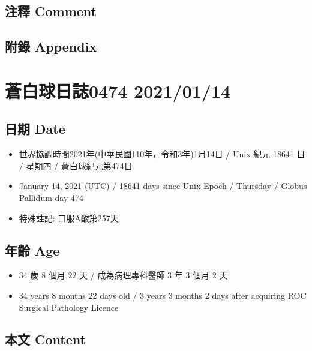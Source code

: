 \documentclass[
]{article}
\providecommand{\tightlist}{%
  \setlength{\itemsep}{0pt}\setlength{\parskip}{0pt}}
\begin{document}
\hypertarget{ux6ce8ux91cb-comment-12}{%
\subsection{注釋 Comment}\label{ux6ce8ux91cb-comment-12}}

\hypertarget{ux9644ux9304-appendix-12}{%
\subsection{附錄 Appendix}\label{ux9644ux9304-appendix-12}}

\hypertarget{ux84bcux767dux7403ux65e5ux8a8c0474-20210114}{%
\section{蒼白球日誌0474
2021/01/14}\label{ux84bcux767dux7403ux65e5ux8a8c0474-20210114}}

\hypertarget{ux65e5ux671f-date-13}{%
\subsection{日期 Date}\label{ux65e5ux671f-date-13}}

\begin{itemize}
\tightlist
\item
  世界協調時間2021年(中華民國110年，令和3年)1月14日 / Unix 紀元 18641 日
  / 星期四 / 蒼白球紀元第474日
\item
  January 14, 2021 (UTC) / 18641 days since Unix Epoch / Thursday /
  Globus Pallidum day 474
\item
  特殊註記: 口服A酸第257天
\end{itemize}

\hypertarget{ux5e74ux9f61-age-13}{%
\subsection{年齡 Age}\label{ux5e74ux9f61-age-13}}

\begin{itemize}
\tightlist
\item
  34 歲 8 個月 22 天 / 成為病理專科醫師 3 年 3 個月 2 天
\item
  34 years 8 months 22 days old / 3 years 3 months 2 days after
  acquiring ROC Surgical Pathology Licence
\end{itemize}

\hypertarget{ux672cux6587-content-13}{%
\subsection{本文 Content}\label{ux672cux6587-content-13}}
\end{document}
